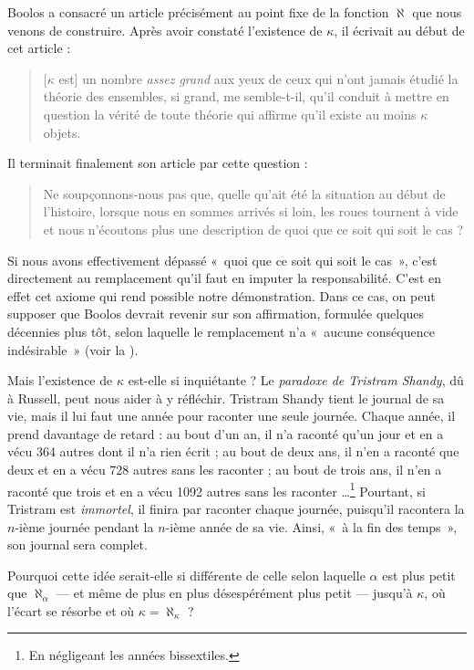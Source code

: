\documentclass[../../../include/open-logic-section]{subfiles}
\begin{document}
Boolos a consacré un article précisément au
point fixe de la fonction $\aleph$ que nous
venons de construire. Après avoir constaté
l'existence de $\kappa$, il écrivait au début
de cet article :
\begin{quote}
	[$\kappa$ est] un nombre \emph{assez grand}
	aux yeux de ceux qui n'ont jamais étudié
	la théorie des ensembles, si grand, me
	semble-t-il, qu'il conduit à mettre en
	question la vérité de toute théorie qui
	affirme qu'il existe au moins $\kappa$
	objets.
	\citep[p.~257]{Boolos2000}
\end{quote}
Il terminait finalement son article
par cette question :
\begin{quote}
	Ne soupçonnons-nous pas que, quelle
	qu'ait été la situation au début de
	l'histoire, lorsque nous en sommes arrivés
	si loin, les roues tournent à vide et
	nous n'écoutons plus une description de
	quoi que ce soit qui soit le cas ?
	\citep[p.~268]{Boolos2000}
\end{quote}
Si nous avons effectivement dépassé
«~quoi que ce soit qui soit le cas~»,
c'est directement au remplacement qu'il faut
en imputer la responsabilité. C'est en effet
cet axiome qui rend possible notre démonstration.
Dans ce cas, on peut supposer que Boolos
devrait revenir sur son affirmation,
formulée quelques décennies plus tôt,
selon laquelle le remplacement n'a
«~aucune conséquence indésirable~»
(voir la ).

Mais l'existence de $\kappa$ est-elle si
inquiétante ? Le \emph{paradoxe de Tristram
Shandy}, dû à Russell, peut nous aider à
y réfléchir. Tristram Shandy tient le journal
de sa vie, mais il lui faut une année pour
raconter une seule journée. Chaque année,
il prend davantage de retard : au bout
d'un an, il n'a raconté qu'un jour et
en a vécu 364 autres dont il n'a rien écrit ;
au bout de deux ans, il n'en a raconté
que deux et en a vécu 728 autres sans
les raconter ; au bout de trois ans,
il n'en a raconté que trois et en a
vécu 1092 autres sans les raconter
\dots\footnote{En négligeant les années
bissextiles.} Pourtant, si Tristram est
\emph{immortel}, il finira par raconter
chaque journée, puisqu'il racontera
la $n$-ième journée pendant la $n$-ième
année de sa vie. Ainsi, «~à la fin
des temps~», son journal sera complet.

Pourquoi cette idée serait-elle si différente
de celle selon laquelle $\alpha$ est plus
petit que $\aleph_\alpha$ — et même de
plus en plus désespérément plus petit —
jusqu'à $\kappa$, où l'écart se résorbe
et où $\kappa = \aleph_\kappa$ ?
\end{document}
